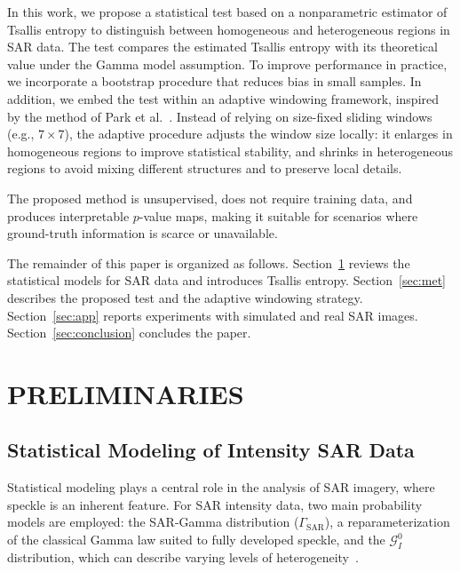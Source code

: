 \documentclass[
  lettersize  journal,
]{IEEEtran}%
\begin{document}
In this work, we propose a statistical test based on a nonparametric
estimator of Tsallis entropy to distinguish between homogeneous and
heterogeneous regions in SAR data. The test compares the estimated
Tsallis entropy with its theoretical value under the Gamma model
assumption. To improve performance in practice, we incorporate a
bootstrap procedure that reduces bias in small samples. In addition, we
embed the test within an adaptive windowing framework, inspired by the
method of Park et al.~. Instead of
relying on size-fixed sliding windows (e.g., \(7 \times 7\)), the
adaptive procedure adjusts the window size locally: it enlarges in
homogeneous regions to improve statistical stability, and shrinks in
heterogeneous regions to avoid mixing different structures and to
preserve local details.

The proposed method is unsupervised, does not require training data, and
produces interpretable \(p\)-value maps, making it suitable for
scenarios where ground-truth information is scarce or unavailable.

The remainder of this paper is organized as follows.
Section~\ref{sec:pre} reviews the statistical models for SAR data and
introduces Tsallis entropy. Section~\ref{sec:met} describes the proposed
test and the adaptive windowing strategy. Section~\ref{sec:app} reports
experiments with simulated and real SAR images.
Section~\ref{sec:conclusion} concludes the paper.

\section{PRELIMINARIES}\label{sec:pre}

\subsection{Statistical Modeling of Intensity SAR
Data}\label{statistical-modeling-of-intensity-sar-data}

Statistical modeling plays a central role in the analysis of SAR
imagery, where speckle is an inherent feature. For SAR intensity data,
two main probability models are employed: the SAR-Gamma distribution
(\(\Gamma_{\text{SAR}}\)), a reparameterization of the classical Gamma
law suited to fully developed speckle, and the \(\mathcal{G}^0_I\)
distribution, which can describe varying levels of
heterogeneity~.
\end{document}

